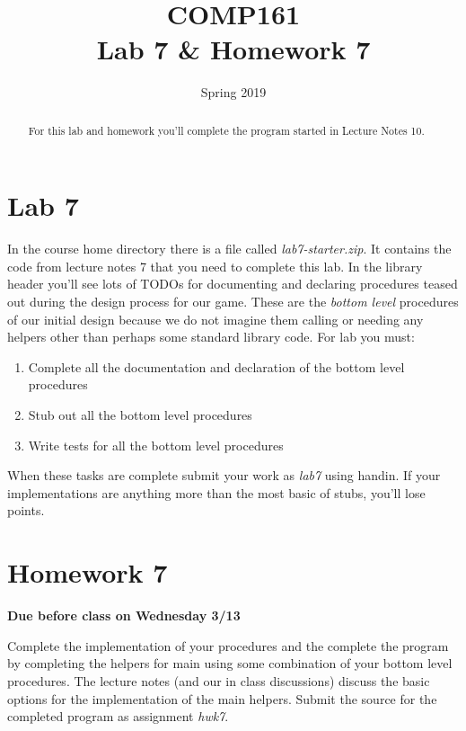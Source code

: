 \documentclass[nobib]{tufte-handout}
\title{COMP161 \\ Lab 7 \& Homework 7}
\author{}
\date{Spring 2019}
\begin{document}
\maketitle

\begin{abstract}
For this lab and homework you'll complete the program started in Lecture Notes 10.
\end{abstract}

\section{Lab 7}

In the course home directory there is a file called \textit{lab7-starter.zip}. It contains the code from lecture notes 7 that you need to complete this lab. In the library header you'll see lots of TODOs for documenting and declaring procedures teased out during the design process for our game. These are the \textit{bottom level} procedures of our initial design because we do not imagine them calling or needing any helpers other than perhaps some standard library code. For lab you must:
\begin{enumerate}
\item Complete all the documentation and declaration of the bottom level procedures
\item Stub out all the bottom level procedures
\item Write tests for all the bottom level procedures
\end{enumerate}
When these tasks are complete submit your work as \textit{lab7} using handin. If your implementations are anything more than the most basic of stubs, you'll lose points.

\section{Homework 7}

\begin{center}
\textbf{Due before class on Wednesday 3/13 }
\end{center}

Complete the implementation of your procedures and the complete the program by completing the helpers for main using some combination of your bottom level procedures. The lecture notes (and our in class discussions) discuss the basic options for the implementation of the main helpers. Submit the source for the completed program as assignment \textit{hwk7}.
\end{document}
